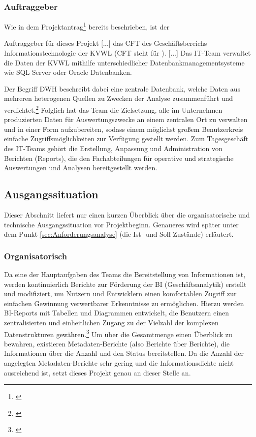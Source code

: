 \subsubsection{Auftraggeber} 
\label{sec:Auftraggeber}
Wie in dem Projektantrag\footnote{\cite{Projektantrag}} bereits beschrieben, ist der
\begin{displayquote}
	Auftraggeber für dieses Projekt [...] das \acs{CFT} \teamName des Geschäftsbereichs Informationstechnologie der \ac{KVWL} (\acs{CFT} steht für ).
	[...]
	Das IT-Team \teamName verwaltet die Daten der \ac{KVWL} mithilfe unterschiedlicher Datenbankmanagementsysteme wie SQL Server oder Oracle Datenbanken.
\end{displayquote}
Der Begriff \ac{DWH} beschreibt dabei eine zentrale Datenbank, welche Daten aus mehreren heterogenen Quellen zu Zwecken der Analyse zusammenführt und verdichtet.\footnote{\Vgl \cite{wiki:dwh}}
Folglich hat das Team die Zielsetzung, alle im Unternehmen produzierten Daten für Auswertungszwecke an einem zentralen Ort zu verwalten und in einer Form aufzubereiten, sodass einem möglichst großem Benutzerkreis einfache Zugriffsmöglichkeiten zur Verfügung gestellt werden.
Zum Tagesgeschäft des IT-Teams \teamName gehört die Erstellung, Anpassung und Administration von Berichten (Reports), die den Fachabteilungen für operative und strategische Auswertungen und Analysen bereitgestellt werden.

\subsection{Ausgangssituation} 
\label{sec:Ausgangssituation}
Dieser Abschnitt liefert nur einen kurzen Überblick über die organisatorische und technische Ausgangssituation vor Projektbeginn. Genaueres wird später unter dem Punkt \ref{sec:Anforderungsanalyse} (\ua die Ist- und Soll-Zustände) erläutert.

\subsubsection{Organisatorisch}
\label{sec:Ausgangssituation:Organisatorisch}
Da eine der Hauptaufgaben des Teams die Bereitstellung von Informationen ist, werden kontinuierlich Berichte zur Förderung der \ac{BI} (Geschäftsanalytik) erstellt und modifiziert, um Nutzern und Entwicklern einen komfortablen Zugriff zur einfachen Gewinnung verwertbarer Erkenntnisse zu ermöglichen. Hierzu werden \ac{BI}-Reports mit Tabellen und Diagrammen entwickelt, die Benutzern einen zentralisierten und einheitlichen Zugang zu der Vielzahl der komplexen Datenstrukturen gewähren.\footnote{\Vgl \cite{Projektantrag}}
Um über die Gesamtmenge einen Überblick zu bewahren, existieren Metadaten-Berichte (also Berichte über Berichte), die \zB Informationen über die Anzahl und den Status bereitstellen.
Da die Anzahl der angelegten Metadaten-Berichte sehr gering und die Informationsdichte nicht ausreichend ist, setzt dieses Projekt genau an dieser Stelle an.

